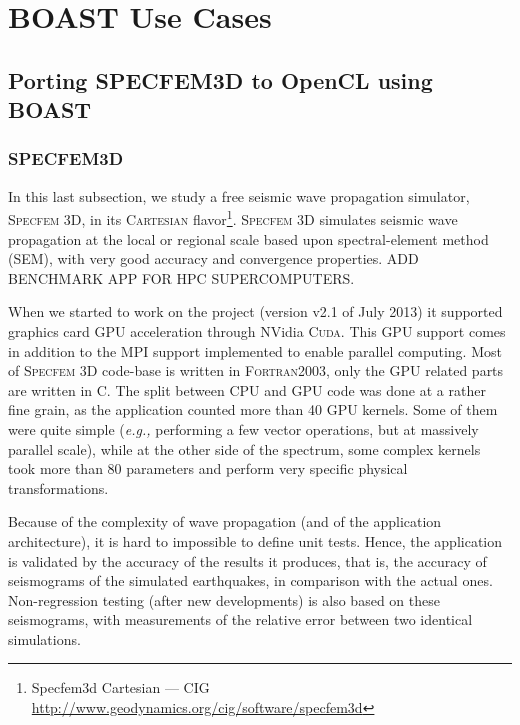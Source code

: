 \newcommand{\productname}[1]{\textsc{#1}}
\newcommand{\latin}[1]{\textit{#1}}

\newcommand{\Specfem}{\productname{Specfem 3D}\xspace}
\newcommand{\Cuda}{\productname{Cuda}\xspace}
\newcommand{\eg}{\latin{e.g.,}\xspace}
\newcommand{\OCL}{\productname{OpenCL}\xspace}
\newcommand{\code}[1]{\texttt{#1}}

\newcommand{\etc}[1]{\latin{etc}}

\section{BOAST Use Cases}

\subsection{Porting SPECFEM3D to OpenCL using BOAST}

\subsubsection{SPECFEM3D}

In this last subsection, we study a free seismic wave propagation
simulator, \Specfem, in its \productname{Cartesian}
flavor\footnote{Specfem3d Cartesian --- CIG
  \url{http://www.geodynamics.org/cig/software/specfem3d}}. \Specfem
simulates seismic wave propagation at the local or regional scale
based upon spectral-element method (SEM), with very good accuracy and
convergence properties. ADD BENCHMARK APP FOR HPC SUPERCOMPUTERS.

When we started to work on the project (version v2.1 of July 2013) it
supported graphics card GPU acceleration through NVidia \Cuda. This
GPU support comes in addition to the MPI support implemented to enable
parallel computing. Most of \Specfem code-base is written in
\productname{Fortran2003}, only the GPU related parts are written in
C.  The split between CPU and GPU code was done at a rather fine
grain, as the application counted more than 40 GPU kernels. Some of
them were quite simple (\eg performing a few vector operations, but at
massively parallel scale), while at the other side of the spectrum,
some complex kernels took more than 80 parameters and perform very
specific physical transformations.

Because of the complexity of wave propagation (and of the application
architecture), it is hard to impossible to define unit tests. Hence,
the application is validated by the accuracy of the results it
produces, that is, the accuracy of seismograms of the simulated
earthquakes, in comparison with the actual ones. Non-regression
testing (after new developments) is also based on these seismograms,
with measurements of the relative error between two identical
simulations.

